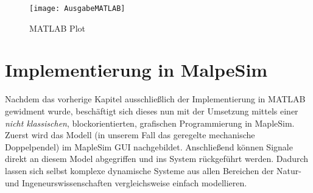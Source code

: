 \documentclass[a4paper, 10pt]{report}
\begin{document}
\begin{figure}[h]
\centering  %
{\texttt{[image: AusgabeMATLAB]}}
\caption{MATLAB Plot}
\end{figure}

\chapter{Implementierung in MalpeSim}
Nachdem das vorherige Kapitel ausschließlich der Implementierung in MATLAB gewidment wurde, beschäftigt sich dieses nun mit der Umsetzung mittels einer \textit{nicht klassischen}, blockorientierten, grafischen Programmierung in MapleSim. \\
Zuerst wird das Modell (in unserem Fall das geregelte mechanische Doppelpendel) im MapleSim GUI nachgebildet. Anschließend können Signale direkt an diesem Model abgegriffen und ins System rückgeführt werden. Dadurch lassen sich selbst komplexe dynamische Systeme aus allen Bereichen der Natur- und Ingeneurswissenschaften vergleichsweise einfach modellieren.
\end{document}
